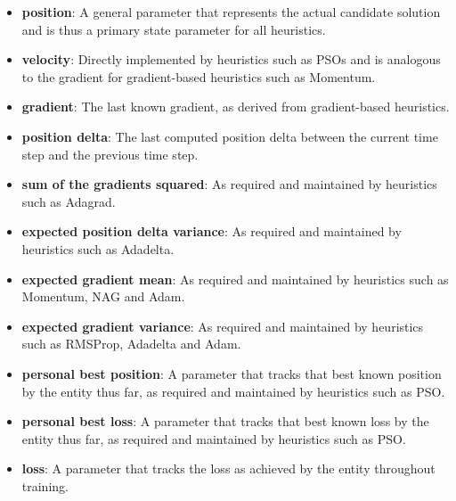 \begin{itemize}
      \item \textbf{position}: A general parameter that represents the actual candidate solution and is thus a primary state parameter for all heuristics.

      \item \textbf{velocity}: Directly implemented by heuristics such as \acp{PSO} and is analogous to the gradient for gradient-based heuristics such as \ac{Momentum}.

      \item \textbf{gradient}: The last known gradient, as derived from gradient-based heuristics.

      \item \textbf{position delta}: The last computed position delta between the current time step and the previous time step.

      \item \textbf{sum of the gradients squared}: As required and maintained by heuristics such as \acs{Adagrad}.

      \item \textbf{expected position delta variance}: As required and maintained by heuristics such as \acs{Adadelta}.

      \item \textbf{expected gradient mean}: As required and maintained by heuristics such as \acs{Momentum}, \acs{NAG} and \acs{Adam}.

      \item \textbf{expected gradient variance}: As required and maintained by heuristics such as \acs{RMSProp}, \acs{Adadelta} and \acs{Adam}.

      \item \textbf{personal best position}: A parameter that tracks that best known position by the entity thus far, as required and maintained by heuristics such as \acs{PSO}.

      \item \textbf{personal best loss}: A parameter that tracks that best known loss by the entity thus far, as required and maintained by heuristics such as \acs{PSO}.

      \item \textbf{loss}: A parameter that tracks the loss as achieved by the entity throughout training.
\end{itemize}

